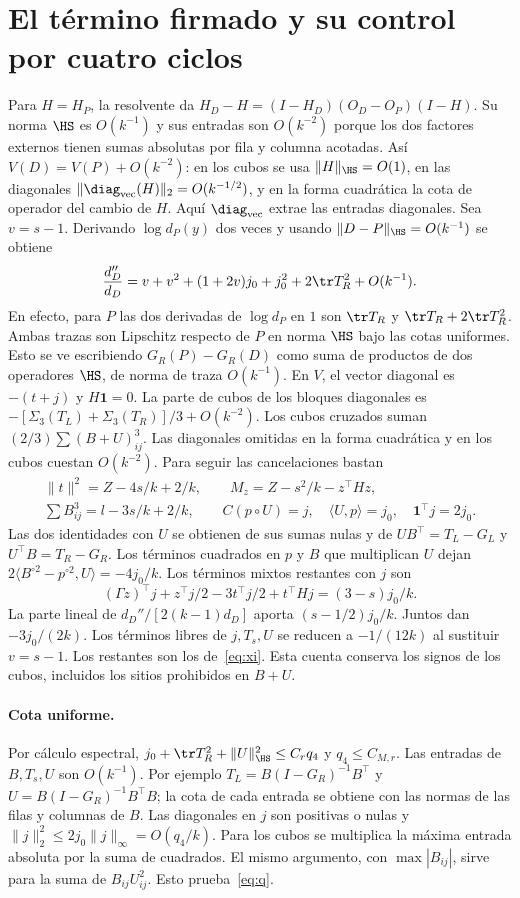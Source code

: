 \section{El término firmado y su control por cuatro ciclos}
Para $H=H_P$, la resolvente da
$H_D-H=(I-H_D)(O_D-O_P)(I-H)$. Su norma $\HS$ es $O(k^{-1})$ y sus entradas son
$O(k^{-2})$ porque los dos factores externos tienen sumas absolutas por fila y columna acotadas.
Así $V(D)=V(P)+O(k^{-2})$: en los cubos se usa
$\|H\|_{\HS}=O(1)$, en las diagonales $\|\diag_{\rm vec}(H)\|_2=O(k^{-1/2})$,
y en la forma cuadrática la cota de operador del cambio de $H$.
Aquí $\diag_{\rm vec}$ extrae las entradas diagonales.
Sea $v=s-1$. Derivando $\log d_P(y)$ dos veces y usando $\|D-P\|_{\HS}=O(k^{-1})$ se obtiene
\[
 \frac{d_D''}{d_D}=v+v^2+(1+2v)j_0+j_0^2+2\tr T_R^2+O(k^{-1}).
\]
En efecto, para $P$ las dos derivadas de $\log d_P$ en $1$ son
$\tr T_R$ y $\tr T_R+2\tr T_R^2$. Ambas trazas son Lipschitz respecto de
$P$ en norma $\HS$ bajo las cotas uniformes. Esto se ve escribiendo
$G_R(P)-G_R(D)$ como suma de productos de dos operadores $\HS$, de norma de traza $O(k^{-1})$.
En $V$, el vector diagonal es $-(t+j)$ y $H\mathbf1=0$.
La parte de cubos de los bloques diagonales es
$-[\Sigma_3(T_L)+\Sigma_3(T_R)]/3+O(k^{-2})$.
Los cubos cruzados suman $(2/3)\sum(B+U)_{ij}^3$.
Las diagonales omitidas en la forma cuadrática y en los cubos cuestan $O(k^{-2})$.
Para seguir las cancelaciones bastan
\begin{gather*}
 \|t\|^2=Z-4s/k+2/k,\qquad M_z=Z-s^2/k-z^\top H z,\\
 \sum B_{ij}^3=l-3s/k+2/k,\qquad
 C(p\circ U)=j,\quad \langle U,p\rangle=j_0,\quad \mathbf1^\top j=2j_0.
\end{gather*}
Las dos identidades con $U$ se obtienen de sus sumas nulas y de
$UB^\top=T_L-G_L$ y $U^\top B=T_R-G_R$.
Los términos cuadrados en $p$ y $B$ que multiplican $U$ dejan
$2\langle B^{\circ2}-p^{\circ2},U\rangle=-4j_0/k$.
Los términos mixtos restantes con $j$ son
\[
 (\Gamma z)^\top j+z^\top j/2-3t^\top j/2+t^\top Hj=(3-s)j_0/k.
\]
La parte lineal de $d_D''/[2(k-1)d_D]$ aporta $(s-1/2)j_0/k$.
Juntos dan $-3j_0/(2k)$. Los términos libres de $j,T_s,U$ se reducen a
$-1/(12k)$ al sustituir $v=s-1$. Los restantes son los de~\eqref{eq:xi}.
Esta cuenta conserva los signos de los cubos, incluidos los sitios prohibidos en $B+U$.
\paragraph{Cota uniforme.}
Por cálculo espectral, $j_0+\tr T_R^2+\|U\|_{\HS}^2\le C_r q_4$ y $q_4\le C_{M,r}$.
Las entradas de $B,T_s,U$ son $O(k^{-1})$. Por ejemplo
$T_L=B(I-G_R)^{-1}B^\top$ y $U=B(I-G_R)^{-1}B^\top B$;
la cota de cada entrada se obtiene con las normas de las filas y columnas de $B$.
Las diagonales en $j$ son positivas o nulas y
$\|j\|_2^2\le 2j_0\|j\|_\infty=O(q_4/k)$. Para los cubos se multiplica la máxima
entrada absoluta por la suma de cuadrados. El mismo argumento, con $\max|B_{ij}|$,
sirve para la suma de $B_{ij}U_{ij}^2$. Esto prueba~\eqref{eq:q}.
